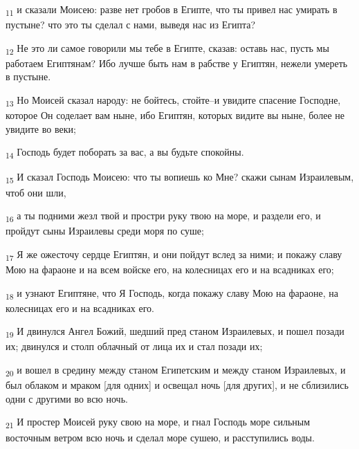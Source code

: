 \begin{tcolorbox}
\textsubscript{11} и сказали Моисею: разве нет гробов в Египте, что ты привел нас умирать в пустыне? что это ты сделал с нами, выведя нас из Египта?
\end{tcolorbox}
\begin{tcolorbox}
\textsubscript{12} Не это ли самое говорили мы тебе в Египте, сказав: оставь нас, пусть мы работаем Египтянам? Ибо лучше быть нам в рабстве у Египтян, нежели умереть в пустыне.
\end{tcolorbox}
\begin{tcolorbox}
\textsubscript{13} Но Моисей сказал народу: не бойтесь, стойте--и увидите спасение Господне, которое Он соделает вам ныне, ибо Египтян, которых видите вы ныне, более не увидите во веки;
\end{tcolorbox}
\begin{tcolorbox}
\textsubscript{14} Господь будет поборать за вас, а вы будьте спокойны.
\end{tcolorbox}
\begin{tcolorbox}
\textsubscript{15} И сказал Господь Моисею: что ты вопиешь ко Мне? скажи сынам Израилевым, чтоб они шли,
\end{tcolorbox}
\begin{tcolorbox}
\textsubscript{16} а ты подними жезл твой и простри руку твою на море, и раздели его, и пройдут сыны Израилевы среди моря по суше;
\end{tcolorbox}
\begin{tcolorbox}
\textsubscript{17} Я же ожесточу сердце Египтян, и они пойдут вслед за ними; и покажу славу Мою на фараоне и на всем войске его, на колесницах его и на всадниках его;
\end{tcolorbox}
\begin{tcolorbox}
\textsubscript{18} и узнают Египтяне, что Я Господь, когда покажу славу Мою на фараоне, на колесницах его и на всадниках его.
\end{tcolorbox}
\begin{tcolorbox}
\textsubscript{19} И двинулся Ангел Божий, шедший пред станом Израилевых, и пошел позади их; двинулся и столп облачный от лица их и стал позади их;
\end{tcolorbox}
\begin{tcolorbox}
\textsubscript{20} и вошел в средину между станом Египетским и между станом Израилевых, и был облаком и мраком [для одних] и освещал ночь [для других], и не сблизились одни с другими во всю ночь.
\end{tcolorbox}
\begin{tcolorbox}
\textsubscript{21} И простер Моисей руку свою на море, и гнал Господь море сильным восточным ветром всю ночь и сделал море сушею, и расступились воды.
\end{tcolorbox}
